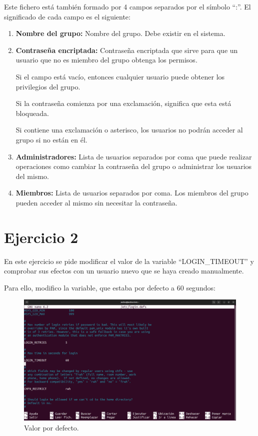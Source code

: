 \documentclass{article}
\begin{document}
Este fichero está también formado por 4 campos separados por el símbolo ``:''. El significado de cada campo es el siguiente:

\begin{enumerate}
    \item \textbf{Nombre del grupo: }Nombre del grupo. Debe existir en el sistema.
    \item \textbf{Contraseña encriptada: }Contraseña encriptada que sirve para que un usuario que no es miembro del grupo obtenga los permisos.
    
    Si el campo está vacío, entonces cualquier usuario puede obtener los privilegios del grupo.

    Si la contraseña comienza por una exclamación, significa que esta está bloqueada.

    Si contiene una exclamación o asterisco, los usuarios no podrán acceder al grupo si no están en él.

    \item \textbf{Administradores: }Lista de usuarios separados por coma que puede realizar operaciones como cambiar la contraseña del grupo o administrar los usuarios del mismo.
    \item \textbf{Miembros: }Lista de usuarios separados por coma. Los miembros del grupo pueden acceder al mismo sin necesitar la contraseña.
\end{enumerate}

\section*{Ejercicio 2}
En este ejercicio se pide modificar el valor de la variable ``LOGIN\_TIMEOUT'' y comprobar sus efectos con un usuario nuevo que se haya creado manualmente.

Para ello, modifico la variable, que estaba por defecto a 60 segundos:

\begin{figure}[H]
    \includegraphics[width=\textwidth]{imagenes/tout60.png}
    \caption{Valor por defecto.}
\end{figure}
\end{document}
